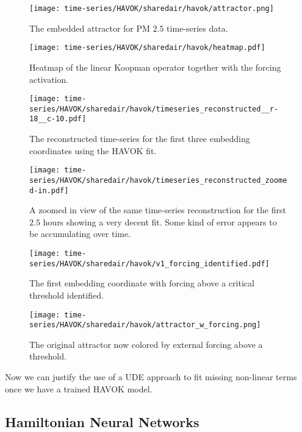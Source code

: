 \begin{figure}[h]
  \centering
  \texttt{[image: time-series/HAVOK/sharedair/havok/attractor.png]}
  \caption{The embedded attractor for PM $2.5$ time-series data.}
\end{figure}


\begin{figure}[h]
  \centering
  \texttt{[image: time-series/HAVOK/sharedair/havok/heatmap.pdf]}
  \caption{Heatmap of the linear Koopman operator together with the forcing activation.}
\end{figure}


\begin{figure}[h]
  \centering
  \texttt{[image: time-series/HAVOK/sharedair/havok/timeseries\_reconstructed\_\_r-18\_\_c-10.pdf]}
  \caption{The reconstructed time-series for the first three embedding coordinates using the HAVOK fit.}
\end{figure}

\begin{figure}[h]
  \centering
  \texttt{[image: time-series/HAVOK/sharedair/havok/timeseries\_reconstructed\_zoomed-in.pdf]}
  \caption{A zoomed in view of the same time-series reconstruction for the first $2.5$ hours showing a very decent fit. Some kind of error appears to be accumulating over time.}
\end{figure}

\begin{figure}[h]
  \centering
  \texttt{[image: time-series/HAVOK/sharedair/havok/v1\_forcing\_identified.pdf]}
  \caption{The first embedding coordinate with forcing above a critical threshold identified.}
\end{figure}

\begin{figure}[h]
  \centering
  \texttt{[image: time-series/HAVOK/sharedair/havok/attractor\_w\_forcing.png]}
  \caption{The original attractor now colored by external forcing above a threshold.}
\end{figure}


Now we can justify the use of a UDE approach to fit missing non-linear terms once we have a trained HAVOK model.



\subsection{Hamiltonian Neural Networks}

